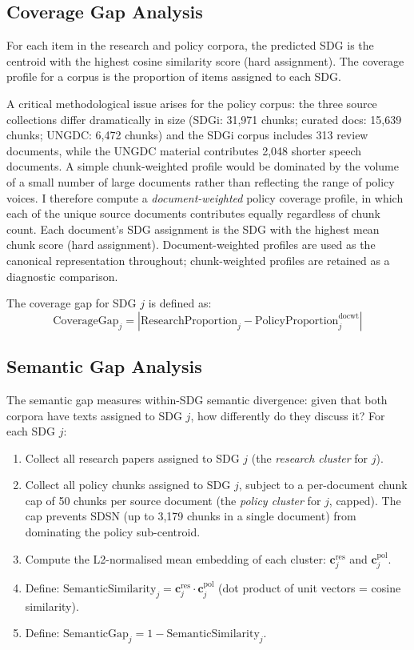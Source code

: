 \documentclass[12pt,a4paper]{article}
\begin{document}
\subsection{Coverage Gap Analysis}

For each item in the research and policy corpora, the predicted SDG is the centroid with the highest cosine similarity score (hard assignment). The coverage profile for a corpus is the proportion of items assigned to each SDG.

A critical methodological issue arises for the policy corpus: the three source collections differ dramatically in size (SDGi: 31,971 chunks; curated docs: 15,639 chunks; UNGDC: 6,472 chunks) and the SDGi corpus includes 313 review documents, while the UNGDC material contributes 2,048 shorter speech documents. A simple chunk-weighted profile would be dominated by the volume of a small number of large documents rather than reflecting the range of policy voices. I therefore compute a \emph{document-weighted} policy coverage profile, in which each of the \NPolicyDocs{} unique source documents contributes equally regardless of chunk count. Each document's SDG assignment is the SDG with the highest mean chunk score (hard assignment). Document-weighted profiles are used as the canonical representation throughout; chunk-weighted profiles are retained as a diagnostic comparison.

The coverage gap for SDG $j$ is defined as:
\[
  \text{CoverageGap}_j = \left|\text{ResearchProportion}_j - \text{PolicyProportion}^{\text{docwt}}_j\right|
\]

\subsection{Semantic Gap Analysis}

The semantic gap measures within-SDG semantic divergence: given that both corpora have texts assigned to SDG $j$, how differently do they discuss it? For each SDG $j$:

\begin{enumerate}
  \item Collect all research papers assigned to SDG $j$ (the \emph{research cluster} for $j$).
  \item Collect all policy chunks assigned to SDG $j$, subject to a per-document chunk cap of 50 chunks per source document (the \emph{policy cluster} for $j$, capped). The cap prevents SDSN (up to 3,179 chunks in a single document) from dominating the policy sub-centroid.
  \item Compute the L2-normalised mean embedding of each cluster: $\mathbf{c}^{\text{res}}_j$ and $\mathbf{c}^{\text{pol}}_j$.
  \item Define: $\text{SemanticSimilarity}_j = \mathbf{c}^{\text{res}}_j \cdot \mathbf{c}^{\text{pol}}_j$ (dot product of unit vectors = cosine similarity).
  \item Define: $\text{SemanticGap}_j = 1 - \text{SemanticSimilarity}_j$.
\end{enumerate}
\end{document}
